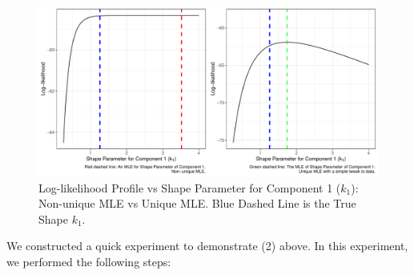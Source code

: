 \documentclass[
]{article}
\begin{document}
\begin{figure}

{\centering \includegraphics{image/test-flat-likelihood} 

}

\caption{Log-likelihood Profile vs Shape Parameter for Component 1 ($k_1$): Non-unique MLE vs Unique MLE.
Blue Dashed Line is the True Shape $k_1$.}\label{fig:flat-loglike-prof}
\end{figure}

We constructed a quick experiment to demonstrate (2) above. In this
experiment, we performed the following steps:
\end{document}
